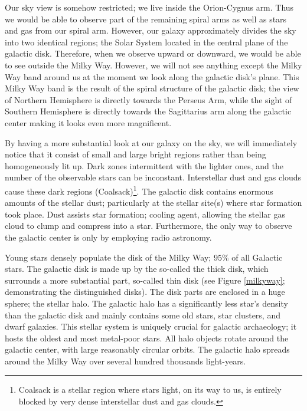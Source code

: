 \vspace{3mm}
Our sky view is somehow restricted; we live inside the Orion-Cygnus arm. Thus we would be able to observe part of the remaining spiral arms as well as stars and gas from our spiral arm. However, our galaxy approximately divides the sky into two identical regions; the Solar System located in the central plane of the galactic disk. Therefore, when we observe upward or downward, we would be able to see outside the Milky Way. However, we will not see anything except the Milky Way band around us at the moment we look along the galactic disk's plane. This Milky Way band is the result of the spiral structure of the galactic disk;  the view of Northern Hemisphere is directly towards the Perseus Arm, while the sight of Southern Hemisphere is directly towards the Sagittarius arm along the galactic center making it looks even more magnificent.


By having a more substantial look at our galaxy on the sky, we will immediately notice that it consist of small and large bright regions rather than being homogeneously lit up. Dark zones intermittent with the lighter ones, and the number of the observable stars can be inconstant. Interstellar dust and gas clouds cause these dark regions (Coalsack)\footnote{Coalsack is a stellar region where stars light, on its way to us, is entirely blocked by very dense interstellar dust and gas clouds.}. The galactic disk contains enormous amounts of the stellar dust; particularly at the stellar site(s) where star formation took place. Dust assists star formation; cooling agent, allowing the stellar gas cloud to clump and compress into a star. Furthermore, the only way to observe the galactic center is only by employing radio astronomy.

Young stars densely populate the disk of the Milky Way; $95\%$ of all Galactic stars. The galactic disk is made up by the so-called the thick disk, which surrounds a more substantial part, so-called thin disk (see Figure \ref{milkyway}; demonstrating the distinguished disks). The disk parts are enclosed in a huge sphere; the stellar halo. The galactic halo has a significantly less star's density than the galactic disk and mainly contains some old stars, star clusters, and dwarf galaxies. This stellar system is uniquely crucial for galactic archaeology; it hosts the oldest and most metal-poor stars. All halo objects rotate around the galactic center, with large reasonably circular orbits. The galactic halo spreads around the Milky Way over several hundred thousands light-years.


